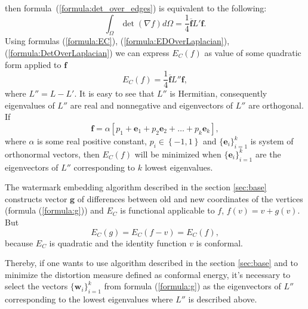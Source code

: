 \documentclass{article}
\newcommand{\conjugate}{\overline}
\begin{document}
then formula~(\ref{formula:det_over_edges}) is equivalent to the following:
\begin{equation}
\label{formula:DetOverLaplacian}
  \int_{\Omega} \det {\left( \nabla f \right) } d\Omega = \frac{1}{4} \conjugate{\mathbf{f}} L' \mathbf{f}.
\end{equation}
Using formulas (\ref{formula:EC}), (\ref{formula:EDOverLaplacian}), (\ref{formula:DetOverLaplacian}) we can express $E_C(f)$ as value of some quadratic form applied to $\mathbf{f}$
\begin{equation*}
  E_C(f) = \frac{1}{4}\conjugate{\mathbf{f}} L'' \mathbf{f},
\end{equation*}
where $L'' = L - L'$. It is easy to see that $L''$ is Hermitian, consequently eigenvalues of $L''$ are real and nonnegative and eigenvectors of $L''$ are orthogonal.
If $$\mathbf{f} = \alpha \left[ p_1 + \mathbf{e}_1 + p_2 \mathbf{e}_2 + \dots + p_k \mathbf{e}_k \right],$$ where $\alpha$ is some real positive constant, $p_i \in \left\{-1, 1 \right\}$ 
and $\{\mathbf{e}_i\}_{i=1}^k$ is system of orthonormal vectors, then $E_C(f)$ will be minimized when $\{\mathbf{e}_i\}_{i=1}^k$ are the eigenvectors of $L''$ corresponding to $k$ lowest eigenvalues. 

The watermark embedding algorithm described in the section \ref{sec:base} constructs vector $\mathbf{g}$ of differences between old and new coordinates of the vertices (formula (\ref{formula:g})) and $E_C$ is functional 
applicable to $f$, $f(v) = v + g(v)$. But $$E_C(g) = E_C(f - v) = E_C(f),$$ because $E_C$ is quadratic and the identity function $v$ is conformal. 

Thereby, if one wants to use algorithm described in the section \ref{sec:base} and to minimize the distortion measure defined as conformal energy, it's necessary to select the vectors $\{\mathbf{w}_i\}_{i=1}^k$ 
from formula (\ref{formula:g}) as the eigenvectors of $L''$ corresponding to the lowest eigenvalues where $L''$ is described above.
\end{document}
